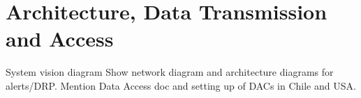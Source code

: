 \section {Architecture, Data Transmission and  Access } \label{sec:dataacess}
System vision diagram
Show network diagram and architecture diagrams for alerts/DRP. Mention Data Access doc  \cite{LDO-013} and
setting up of DACs in Chile and USA.
